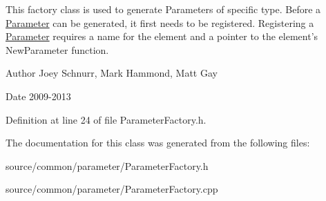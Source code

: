 This factory class is used to generate Parameters of specific type. Before a \hyperlink{class_picto_1_1_parameter}{Parameter} can be generated, it first needs to be registered. Registering a \hyperlink{class_picto_1_1_parameter}{Parameter} requires a name for the element and a pointer to the element's New\-Parameter function. \begin{DoxyAuthor}{Author}
Joey Schnurr, Mark Hammond, Matt Gay 
\end{DoxyAuthor}
\begin{DoxyDate}{Date}
2009-\/2013 
\end{DoxyDate}


Definition at line 24 of file Parameter\-Factory.\-h.



The documentation for this class was generated from the following files\-:\begin{DoxyCompactItemize}
\item 
source/common/parameter/Parameter\-Factory.\-h\item 
source/common/parameter/Parameter\-Factory.\-cpp\end{DoxyCompactItemize}
